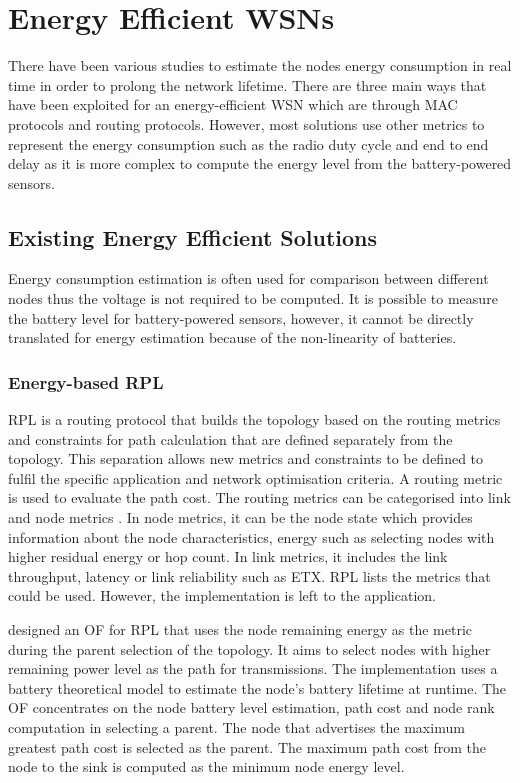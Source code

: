 \chapter{Energy Efficient WSNs}
\label{energyLoss}
There have been various studies to estimate the nodes energy consumption in real time in order to prolong the network lifetime. There are three main ways that have been exploited for an energy-efficient WSN which are through MAC protocols and routing protocols. However, most solutions use other metrics to represent the energy consumption such as the radio duty cycle and end to end delay as it is more complex to compute the energy level from the battery-powered sensors. 

\section{Existing Energy Efficient Solutions}
Energy consumption estimation is often used for comparison between different nodes thus the voltage is not required to be computed. It is possible to measure the battery level for battery-powered sensors, however, it cannot be directly translated for energy estimation because of the non-linearity of batteries.

\subsection{Energy-based RPL}
RPL is a routing protocol that builds the topology based on the routing metrics and constraints for path calculation that are defined separately from the topology. This separation allows new metrics and constraints to be defined to fulfil the specific application and network optimisation criteria. A routing metric is used to evaluate the path cost. The routing metrics can be categorised into link and node metrics \cite{routingmetrics}. In node metrics, it can be the node state which provides information about the node characteristics, energy such as selecting nodes with higher residual energy or hop count. In link metrics, it includes the link throughput, latency or link reliability such as ETX. RPL lists the metrics that could be used. However, the implementation is left to the application. 

\cite{energyrpl} designed an OF for RPL that uses the node remaining energy as the metric during the parent selection of the topology. It aims to select nodes with higher remaining power level as the path for transmissions. The implementation uses a battery theoretical model \cite{sensornets13} to estimate the node's battery lifetime at runtime. The OF concentrates on the node battery level estimation, path cost and node rank computation in selecting a parent. The node that advertises the maximum greatest path cost is selected as the parent. The maximum path cost from the node to the sink is computed as the minimum node energy level. 

